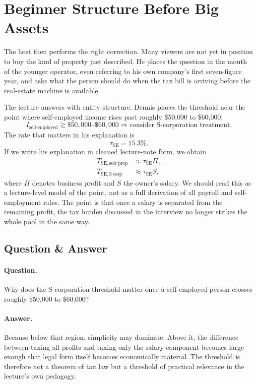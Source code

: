 \section{Beginner Structure Before Big Assets}

The host then performs the right correction. Many viewers are not yet in position to buy the kind of property just described. He places the question in the mouth of the younger operator, even referring to his own company's first seven-figure year, and asks what the person should do when the tax bill is arriving before the real-estate machine is available.

The lecture answers with entity structure. Dennis places the threshold near the point where self-employed income rises past roughly \$50{,}000 to \$60{,}000:
\begin{equation}
I_{\text{self-employed}} \gtrsim \$50{,}000\text{--}\$60{,}000
\Rightarrow
\text{consider S-corporation treatment}.
\end{equation}
The rate that matters in his explanation is
\begin{equation}
\tau_{\mathrm{SE}} = 15.3\%.
\end{equation}
If we write his explanation in cleaned lecture-note form, we obtain
\begin{align}
T_{\mathrm{SE,sole\ prop}} &\approx \tau_{\mathrm{SE}}\Pi, \\
T_{\mathrm{SE,S\ corp}} &\approx \tau_{\mathrm{SE}}S,
\end{align}
where \(\Pi\) denotes business profit and \(S\) the owner's salary. We should read this as a lecture-level model of the point, not as a full derivation of all payroll and self-employment rules. The point is that once a salary is separated from the remaining profit, the tax burden discussed in the interview no longer strikes the whole pool in the same way.

\subsection{Question \& Answer}

\paragraph{Question.} Why does the S-corporation threshold matter once a self-employed person crosses roughly \$50{,}000 to \$60{,}000?

\paragraph{Answer.} Because below that region, simplicity may dominate. Above it, the difference between taxing all profits and taxing only the salary component becomes large enough that legal form itself becomes economically material. The threshold is therefore not a theorem of tax law but a threshold of practical relevance in the lecture's own pedagogy.

